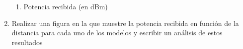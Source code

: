 \begin{enumerate}
\begin{enumerate}
		      \item Potencia recibida (en dBm)
	      \end{enumerate}
	      \begin{table}[H]
		      \centering
		      \caption{Parámetros del modelo lognormal con $\alpha=2.8$ y $\sigma=7$ dB}
		      \label{tab:modelo_lognormal}
	      \end{table}

	\item  Realizar una figura en la que muestre la potencia recibida en función de la distancia para cada uno de los modelos y escribir un análisis de estos resultados


\end{enumerate}